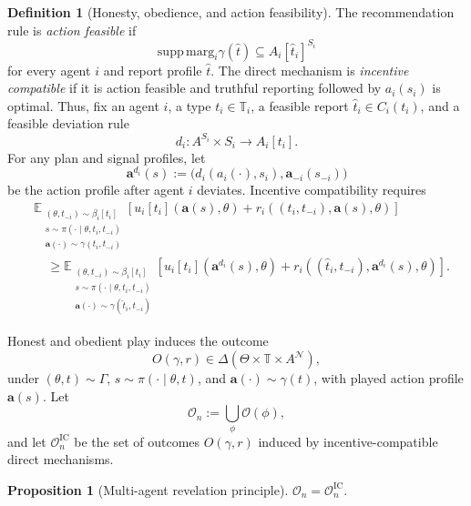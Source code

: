 \documentclass[12pt,reqno]{article}
\newcommand{\Ex}{\mathbb{E}}
\newcommand{\supp}{\mathrm{supp}}
\newcommand{\marg}{\mathrm{marg}}
\newcommand{\ba}{\mathbf{a}}
\theoremstyle{definition} \newtheorem{example}{Example}
\theoremstyle{definition} \newtheorem{condition}{Condition}
\theoremstyle{definition} \newtheorem{corollary}{Corollary}
\theoremstyle{definition} \newtheorem{claim}{Claim}
\theoremstyle{definition} \newtheorem{definition}{Definition}
\theoremstyle{definition} \newtheorem{conjecture}{Conjecture}
\theoremstyle{definition} \newtheorem{Lemma}{Lemma}
\theoremstyle{definition} \newtheorem{lemma}{Lemma}
\theoremstyle{plain} \newtheorem{theorem}{Theorem}
\theoremstyle{definition} \newtheorem{assumption}{Assumption}
\theoremstyle{definition} \newtheorem*{assumptionnonumber}{Assumption}
\theoremstyle{definition} \newtheorem*{theoremNoNumber}{Proposition}
\theoremstyle{definition}\newtheorem{proposition}{Proposition}
\theoremstyle{definition} \newtheorem{observation}{Observation}
\theoremstyle{definition} \newtheorem*{definitionNoNumber}{Definition}
\theoremstyle{definition} \newtheorem{Definition}{Definition}
\theoremstyle{definition} \newtheorem*{DefinitionNoNumber}{Definition}
\theoremstyle{definition} \newtheorem*{fact}{Fact}
\theoremstyle{definition} \newtheorem*{property}{Property}
\theoremstyle{definition} \newtheorem{remark}{Remark}
\theoremstyle{definition}\newtheorem{romanexampleinner}{Example}
\begin{document}
\begin{definition}[Honesty, obedience, and action feasibility]\label{def:ic}
The recommendation rule is \emph{action feasible} if
\[
\supp\,\marg_i\gamma(\hat t)
\subseteq
A_i[\hat t_i]^{S_i}
\]
for every agent $i$ and report profile $\hat t$. The direct mechanism is \emph{incentive compatible} if it is action feasible and truthful reporting followed by $a_i(s_i)$ is optimal. Thus, fix an agent $i$, a type $t_i\in\mathbb T_i$, a feasible report {$\hat t_i\in C_i(t_i)$}, and a feasible deviation rule
\[
d_i:A^{S_i}\times S_i\to A_i[t_i].
\]
For any plan and signal profiles, let
\[
\ba^{d_i}(s)
:=
\big(d_i(a_i(\cdot),s_i),\ba_{-i}(s_{-i})\big)
\]
be the action profile after agent $i$ deviates. Incentive compatibility requires
\begin{align*}
&\Ex_{\substack{(\theta,t_{-i})\sim\beta_i[t_i]\\
 s\sim\pi(\cdot\mid\theta,t_i,t_{-i})\\
\ba(\cdot)\sim\gamma(t_i,t_{-i})}}
\left[
u_i[t_i](\ba(s),\theta)
+r_i((t_i,t_{-i}),\ba(s),\theta)
\right]
\\
&\quad\geq
\Ex_{\substack{(\theta,t_{-i})\sim\beta_i[t_i]\\
 s\sim\pi(\cdot\mid\theta,t_i,t_{-i})\\
\ba(\cdot)\sim\gamma(\hat t_i,t_{-i})}}
\left[
u_i[t_i](\ba^{d_i}(s),\theta)
+r_i((\hat t_i,t_{-i}),\ba^{d_i}(s),\theta)
\right].
\end{align*}
\end{definition}

Honest and obedient play induces the outcome
\[
O(\gamma,r)
\in
\Delta\left(\Theta\times\mathbb T\times A^{\mathcal N}\right),
\]
under $(\theta,t)\sim\Gamma$, $s\sim\pi(\cdot\mid\theta,t)$, and $\ba(\cdot)\sim\gamma(t)$, with played action profile $\ba(s)$. Let
\[
\mathcal O_n:=\bigcup_{\phi}\mathcal O(\phi),
\]
and let $\mathcal O_n^{\mathrm{IC}}$ be the set of outcomes $O(\gamma,r)$ induced by incentive-compatible direct mechanisms.

\begin{proposition}[Multi-agent revelation principle]\label{prop:ma-revelation}
$\mathcal O_n=\mathcal O_n^{\mathrm{IC}}$.
\end{proposition}
\end{document}
